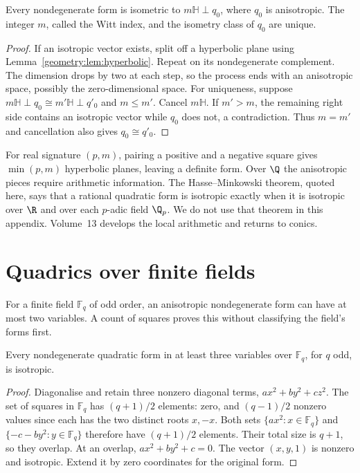 \begin{corollary}\label{geometry:cor:wittindex}
Every nondegenerate form is isometric to $m\mathbb H\perp q_0$, where
$q_0$ is anisotropic. The integer $m$, called the Witt index, and the
isometry class of $q_0$ are unique.
\end{corollary}
\begin{proof}
If an isotropic vector exists, split off a hyperbolic plane using
Lemma~\ref{geometry:lem:hyperbolic}. Repeat on its nondegenerate complement.
The dimension drops by two at each step, so the process ends with an
anisotropic space, possibly the zero-dimensional space.
For uniqueness, suppose
$m\mathbb H\perp q_0\cong m'\mathbb H\perp q'_0$ and $m\le m'$.
Cancel $m\mathbb H$. If $m'>m$, the remaining right side contains an
isotropic vector while $q_0$ does not, a contradiction.
Thus $m=m'$ and cancellation also gives $q_0\cong q'_0$.
\end{proof}

For real signature $(p,m)$, pairing a positive and a negative square gives
$\min(p,m)$ hyperbolic planes, leaving a definite form.
Over $\Q$ the anisotropic pieces require arithmetic information.
The Hasse--Minkowski theorem, quoted here, says that a rational quadratic
form is isotropic exactly when it is isotropic over $\R$ and over each
$p$-adic field $\Q_p$. We do not use that theorem in this appendix.
Volume~13 develops the local arithmetic and returns to conics.

\section{Quadrics over finite fields}

For a finite field $\mathbb F_q$ of odd order, an anisotropic nondegenerate
form can have at most two variables. A count of squares proves this
without classifying the field's forms first.

\begin{proposition}\label{geometry:prop:chevalley}
Every nondegenerate quadratic form in at least three variables over
$\mathbb F_q$, for $q$ odd, is isotropic.
\end{proposition}
\begin{proof}
Diagonalise and retain three nonzero diagonal terms, $ax^2+by^2+cz^2$.
The set of squares in $\mathbb F_q$ has $(q+1)/2$ elements: zero,
and $(q-1)/2$ nonzero values since each has the two distinct roots $x,-x$.
Both sets
$\{ax^2:x\in\mathbb F_q\}$ and
$\{-c-by^2:y\in\mathbb F_q\}$ therefore have $(q+1)/2$ elements.
Their total size is $q+1$, so they overlap. At an overlap,
$ax^2+by^2+c=0$. The vector $(x,y,1)$ is nonzero and isotropic.
Extend it by zero coordinates for the original form.
\end{proof}

